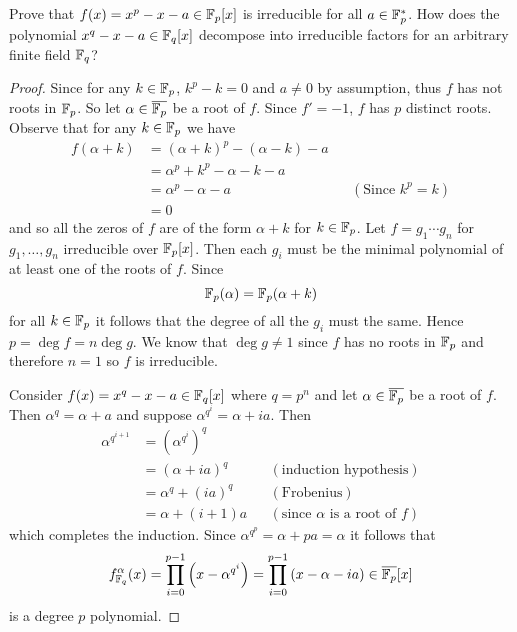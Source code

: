 \begin{ex}{22.30}
    Prove that $f(x)=x^p-x-a\in\mathbb{F}_p[x]$ is irreducible for all $a\in\mathbb{F}_p^*$. 
    How does the polynomial $x^q-x-a\in\mathbb{F}_q[x]$ decompose into irreducible factors for an arbitrary finite field $\mathbb{F}_q$?
\end{ex}
\begin{proof}
    Since for any $k\in\mathbb{F}_p$, $k^p-k=0$ and $a\neq 0$ by assumption, thus $f$ has not roots in $\mathbb{F}_p$.
    So let $\alpha\in\overline{\mathbb{F}_p}$ be a root of $f$.  Since $f'=-1$, $f$ has $p$ distinct roots.
    Observe that for any $k\in\mathbb{F}_p$ we have
    \begin{align*}
        f(\alpha+k)&=(\alpha+k)^p-(\alpha-k)-a\\
        &=\alpha^p+k^p-\alpha-k-a\\
        &=\alpha^p-\alpha-a&&(\text{Since }k^p=k)\\
        &=0
    \end{align*}
    and so all the zeros of $f$ are of the form $\alpha+k$ for $k\in\mathbb{F}_p$.
    Let $f=g_1\cdots g_n$ for $g_1,\dots,g_n$ irreducible over $\mathbb{F}_p[x]$. 
    Then each $g_i$ must be the minimal polynomial of at least one of the roots of $f$. Since 
    $$\mathbb{F}_p(\alpha)=\mathbb{F}_p(\alpha+k)$$
    for all $k\in\mathbb{F}_p$ it follows that the degree of all the $g_i$ must the same. Hence $p =\deg f = n\deg g$.
    We know that $\deg g\neq 1$ since $f$ has no roots in $\mathbb{F}_p$ and therefore $n=1$ so $f$ is irreducible. 

    Consider $f(x)=x^q-x-a\in\mathbb{F}_q[x]$ where $q=p^n$ and let $\alpha\in\overline{\mathbb{F}_p}$ be a root of $f$.
    Then $\alpha^q=\alpha+a$ and suppose $\alpha^{q^i}=\alpha+ia$. Then 
    \begin{align*}
        \alpha^{q^{i+1}}&=\left(\alpha^{q^i}\right)^q\\
        &=\left(\alpha+i a\right)^q&&(\text{induction hypothesis})\\
        &=\alpha^q+(i a)^q&&(\text{Frobenius})\\
        &=\alpha+(i+1)a&&(\text{since $\alpha$ is a root of $f$})
    \end{align*}
    which completes the induction. Since $\alpha^{q^p}=\alpha+pa=\alpha$ it follows that
    $$f_{\mathbb{F}_q}^\alpha(x)=\prod_{i=0}^{p-1}\left(x-\alpha^{q^i}\right)=\prod_{i=0}^{p-1}\left(x-\alpha-ia\right)\in\overline{\mathbb{F}_p}[x]$$
    is a degree $p$ polynomial.

\end{proof}

